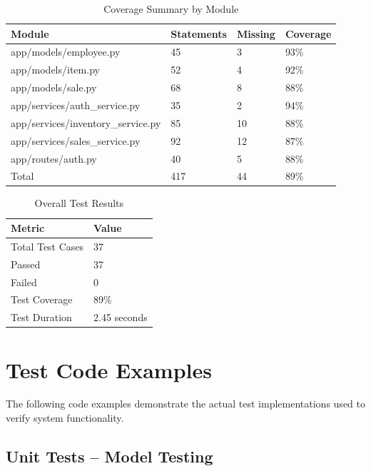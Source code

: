 \begin{table}[h]
  \centering
  \caption{Coverage Summary by Module}
  \begin{tabular}{p{5.5cm} p{2cm} p{2cm} p{2cm}}
    \toprule
    \textbf{Module} & \textbf{Statements} & \textbf{Missing} & \textbf{Coverage} \\
    \midrule
    app/models/employee.py         & 45  & 3  & 93\% \\
    app/models/item.py             & 52  & 4  & 92\% \\
    app/models/sale.py             & 68  & 8  & 88\% \\
    app/services/auth\_service.py  & 35  & 2  & 94\% \\
    app/services/inventory\_service.py & 85 & 10 & 88\% \\
    app/services/sales\_service.py & 92  & 12 & 87\% \\
    app/routes/auth.py             & 40  & 5  & 88\% \\
    \midrule
    Total                          & 417 & 44 & 89\% \\
    \bottomrule
  \end{tabular}
\end{table}

\begin{table}[h]
  \centering
  \caption{Overall Test Results}
  \begin{tabular}{p{4cm} p{4cm}}
    \toprule
    \textbf{Metric} & \textbf{Value} \\
    \midrule
    Total Test Cases & 37 \\
    Passed           & 37 \\
    Failed           & 0 \\
    Test Coverage    & 89\% \\
    Test Duration    & 2.45 seconds \\
    \bottomrule
  \end{tabular}
\end{table}

\section{Test Code Examples}

The following code examples demonstrate the actual test implementations
used to verify system functionality.

\subsection{Unit Tests -- Model Testing}

